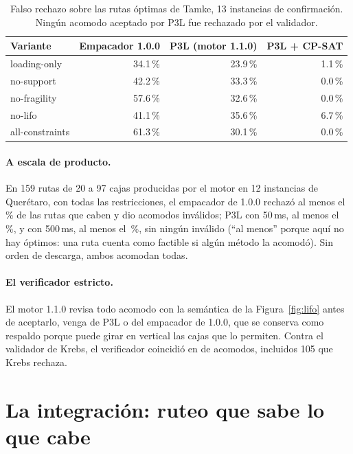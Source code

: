 \documentclass[11pt,a4paper]{article}
\begin{document}
\begin{table}[H]
\centering
\caption{Falso rechazo sobre las rutas óptimas de Tamke, 13 instancias de confirmación. Ningún acomodo
aceptado por P3L fue rechazado por el validador.}
\label{tab:nivel1}
\begin{tabular}{lrrr}
\toprule
Variante & Empacador 1.0.0 & \textbf{P3L} (motor 1.1.0) & P3L + CP-SAT \\
\midrule
loading-only & 34.1\,\% & 23.9\,\% & 1.1\,\% \\
no-support & 42.2\,\% & 33.3\,\% & 0.0\,\% \\
no-fragility & 57.6\,\% & 32.6\,\% & 0.0\,\% \\
no-lifo & 41.1\,\% & 35.6\,\% & 6.7\,\% \\
all-constraints & 61.3\,\% & 30.1\,\% & 0.0\,\% \\
\bottomrule
\end{tabular}
\end{table}

\paragraph{A escala de producto.} En 159 rutas de 20 a 97 cajas producidas por el motor en 12
instancias de Querétaro, con todas las restricciones, el empacador de 1.0.0 rechazó al menos el
\ProdRechazoMotor\,\% de las rutas que caben y dio \ProdInvalidosMotor{} acomodos inválidos; P3L con
50\,ms, al menos el \ProdRechazoPtresL\,\%, y con 500\,ms, al menos el \ProdRechazoPtresLq\,\%, sin
ningún inválido (``al menos'' porque aquí no hay óptimos: una ruta cuenta como factible si algún
método la acomodó). Sin orden de descarga, ambos acomodan todas.

\paragraph{El verificador estricto.} El motor 1.1.0 revisa todo acomodo con la semántica de la
Figura~\ref{fig:lifo} antes de aceptarlo, venga de P3L o del empacador de 1.0.0, que se conserva como
respaldo porque puede girar en vertical las cajas que lo permiten. Contra el validador de Krebs, el
verificador coincidió en \VerifConcuerda{} de \VerifConcuerda{} acomodos, incluidos 105 que Krebs
rechaza.

\section{La integración: ruteo que sabe lo que cabe}
\label{sec:integracion}
\end{document}
